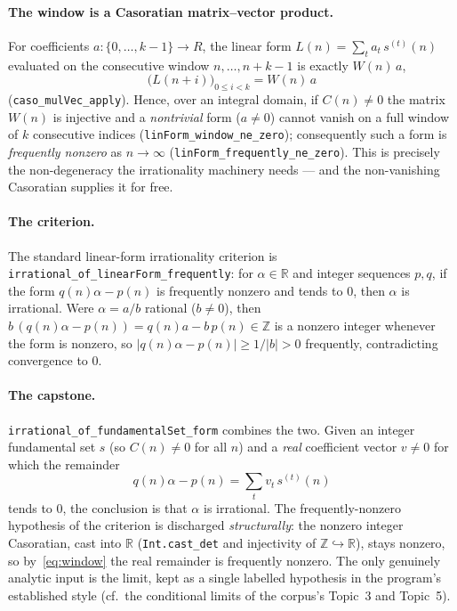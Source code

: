 \documentclass[11pt]{article}
\newcommand{\Z}{\mathbb{Z}}
\newcommand{\R}{\mathbb{R}}
\newcommand{\Caso}{C}
\newcommand{\CasoM}{W}
\begin{document}
\paragraph{The window is a Casoratian matrix--vector product.}
For coefficients $a\colon\{0,\dots,k-1\}\to R$, the linear form
$L(n)=\sum_t a_t\,s^{(t)}(n)$ evaluated on the consecutive window $n,\dots,n+k-1$ is
exactly $\CasoM(n)\,a$,
\begin{equation}\label{eq:window}
  \big(L(n+i)\big)_{0\le i<k}=\CasoM(n)\,a
\end{equation}
(\texttt{caso\_mulVec\_apply}). Hence, over an integral domain, if $\Caso(n)\ne0$ the
matrix $\CasoM(n)$ is injective and a \emph{nontrivial} form ($a\ne0$) cannot vanish on
a full window of $k$ consecutive indices (\texttt{linForm\_window\_ne\_zero});
consequently such a form is \emph{frequently nonzero} as $n\to\infty$
(\texttt{linForm\_frequently\_ne\_zero}). This is precisely the non-degeneracy the
irrationality machinery needs --- and the non-vanishing Casoratian supplies it for free.

\paragraph{The criterion.}
The standard linear-form irrationality criterion is
\texttt{irrational\_of\_linearForm\_frequently}: for $\alpha\in\R$ and integer sequences
$p,q$, if the form $q(n)\alpha-p(n)$ is frequently nonzero and tends to $0$, then
$\alpha$ is irrational. Were $\alpha=a/b$ rational ($b\ne0$), then
$b\,(q(n)\alpha-p(n))=q(n)a-b\,p(n)\in\Z$ is a nonzero integer whenever the form is
nonzero, so $|q(n)\alpha-p(n)|\ge1/|b|>0$ frequently, contradicting convergence to $0$.

\paragraph{The capstone.}
\texttt{irrational\_of\_fundamentalSet\_form} combines the two. Given an integer
fundamental set $s$ (so $\Caso(n)\ne0$ for all $n$) and a \emph{real} coefficient vector
$v\ne0$ for which the remainder
\[
  q(n)\alpha-p(n)=\sum_t v_t\,s^{(t)}(n)
\]
tends to $0$, the conclusion is that $\alpha$ is irrational. The frequently-nonzero
hypothesis of the criterion is discharged \emph{structurally}: the nonzero integer
Casoratian, cast into $\R$ (\texttt{Int.cast\_det} and injectivity of $\Z\hookrightarrow\R$),
stays nonzero, so by~\eqref{eq:window} the real remainder is frequently nonzero. The
only genuinely analytic input is the limit, kept as a single labelled hypothesis in the
program's established style (cf.\ the conditional limits of the corpus's Topic~3 and
Topic~5).
\end{document}
